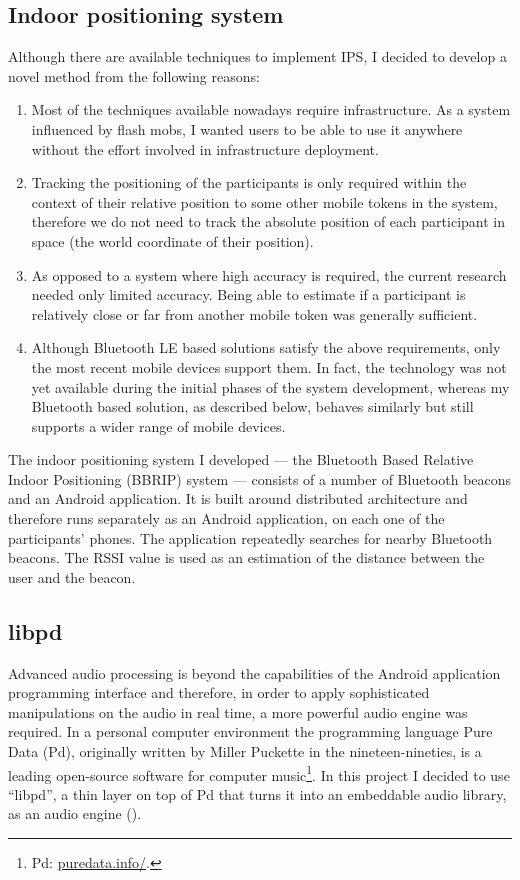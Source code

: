 \documentclass[a4paper,11pt]{article}
\begin{document}
\subsection{Indoor positioning system}\label{methods:ips}

Although there are available techniques to implement IPS, I decided to develop a novel method from the following reasons:

\begin{enumerate}
	\item Most of the techniques available nowadays require infrastructure.
	As a system influenced by flash mobs, I wanted users to be able to use it anywhere without the effort involved in infrastructure deployment.
	\item Tracking the positioning of the participants is only required within the context of their relative position to some other mobile tokens in the system, therefore we do not need to track the absolute position of each participant in space (the world coordinate of their position).
	\item As opposed to a system where high accuracy is required, the current research needed only limited accuracy.
	Being able to estimate if a participant is relatively close or far from another mobile token was generally sufficient.
        \item Although Bluetooth LE based solutions satisfy the above requirements, only the most recent mobile devices support them. In fact, the technology was not yet available during the initial phases of the system development, whereas my Bluetooth based solution, as described below, behaves similarly but still supports a wider range of mobile devices.
\end{enumerate}

The indoor positioning system I developed --- the Bluetooth Based Relative Indoor Positioning (BBRIP) system --- consists of a number of Bluetooth beacons and an Android application.
It is built around distributed architecture and therefore runs separately as an Android application, on each one of the participants' phones.
The application repeatedly searches for nearby Bluetooth beacons.
The RSSI value is used as an estimation of the distance between the user and the beacon.

\subsection{libpd}\label{methods:libpd}

Advanced audio processing is beyond the capabilities of the Android application programming interface and therefore, in order to apply sophisticated manipulations on the audio in real time, a more powerful audio engine was required.
In a personal computer environment the programming language Pure Data (Pd), originally written by Miller Puckette in the nineteen-nineties, is a leading open-source software for computer music\footnote{Pd: \href{http://puredata.info/}{puredata.info/}.}.
In this project I decided to use ``libpd'', a thin layer on top of Pd that turns it into an embeddable audio library, as an audio engine (\cite[p. v]{brinkmann12}).
\end{document}

